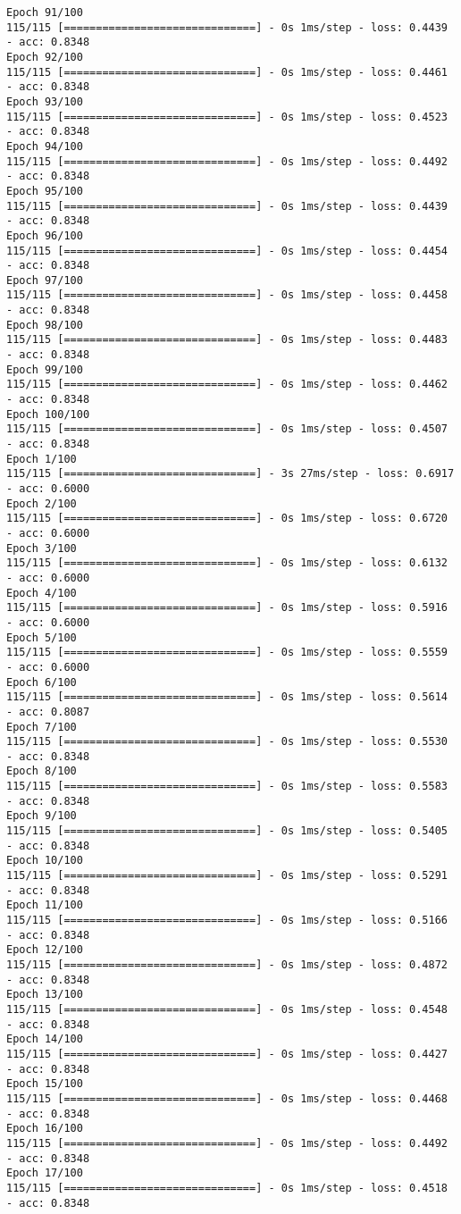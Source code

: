 \documentclass[11pt]{article}
\begin{document}
\begin{Verbatim}[commandchars=\\\{\}]
Epoch 91/100
115/115 [==============================] - 0s 1ms/step - loss: 0.4439 - acc: 0.8348
Epoch 92/100
115/115 [==============================] - 0s 1ms/step - loss: 0.4461 - acc: 0.8348
Epoch 93/100
115/115 [==============================] - 0s 1ms/step - loss: 0.4523 - acc: 0.8348
Epoch 94/100
115/115 [==============================] - 0s 1ms/step - loss: 0.4492 - acc: 0.8348
Epoch 95/100
115/115 [==============================] - 0s 1ms/step - loss: 0.4439 - acc: 0.8348
Epoch 96/100
115/115 [==============================] - 0s 1ms/step - loss: 0.4454 - acc: 0.8348
Epoch 97/100
115/115 [==============================] - 0s 1ms/step - loss: 0.4458 - acc: 0.8348
Epoch 98/100
115/115 [==============================] - 0s 1ms/step - loss: 0.4483 - acc: 0.8348
Epoch 99/100
115/115 [==============================] - 0s 1ms/step - loss: 0.4462 - acc: 0.8348
Epoch 100/100
115/115 [==============================] - 0s 1ms/step - loss: 0.4507 - acc: 0.8348
Epoch 1/100
115/115 [==============================] - 3s 27ms/step - loss: 0.6917 - acc: 0.6000
Epoch 2/100
115/115 [==============================] - 0s 1ms/step - loss: 0.6720 - acc: 0.6000
Epoch 3/100
115/115 [==============================] - 0s 1ms/step - loss: 0.6132 - acc: 0.6000
Epoch 4/100
115/115 [==============================] - 0s 1ms/step - loss: 0.5916 - acc: 0.6000
Epoch 5/100
115/115 [==============================] - 0s 1ms/step - loss: 0.5559 - acc: 0.6000
Epoch 6/100
115/115 [==============================] - 0s 1ms/step - loss: 0.5614 - acc: 0.8087
Epoch 7/100
115/115 [==============================] - 0s 1ms/step - loss: 0.5530 - acc: 0.8348
Epoch 8/100
115/115 [==============================] - 0s 1ms/step - loss: 0.5583 - acc: 0.8348
Epoch 9/100
115/115 [==============================] - 0s 1ms/step - loss: 0.5405 - acc: 0.8348
Epoch 10/100
115/115 [==============================] - 0s 1ms/step - loss: 0.5291 - acc: 0.8348
Epoch 11/100
115/115 [==============================] - 0s 1ms/step - loss: 0.5166 - acc: 0.8348
Epoch 12/100
115/115 [==============================] - 0s 1ms/step - loss: 0.4872 - acc: 0.8348
Epoch 13/100
115/115 [==============================] - 0s 1ms/step - loss: 0.4548 - acc: 0.8348
Epoch 14/100
115/115 [==============================] - 0s 1ms/step - loss: 0.4427 - acc: 0.8348
Epoch 15/100
115/115 [==============================] - 0s 1ms/step - loss: 0.4468 - acc: 0.8348
Epoch 16/100
115/115 [==============================] - 0s 1ms/step - loss: 0.4492 - acc: 0.8348
Epoch 17/100
115/115 [==============================] - 0s 1ms/step - loss: 0.4518 - acc: 0.8348

\end{Verbatim}
\end{document}
